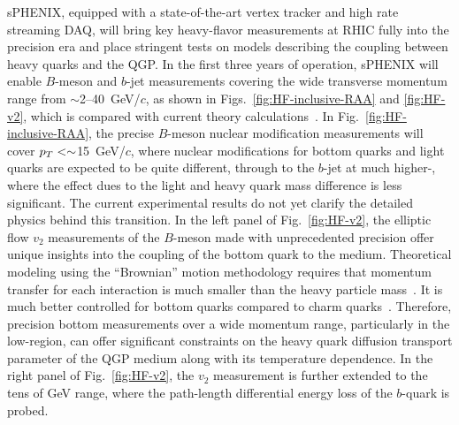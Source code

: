 sPHENIX, equipped with a state-of-the-art vertex tracker and high rate
streaming DAQ, will bring key heavy-flavor measurements at RHIC fully
into the precision era and place stringent tests on models describing
the coupling between heavy quarks and the QGP. In the first three
years of operation, sPHENIX will enable $B$-meson and $b$-jet
measurements covering the wide transverse momentum range from
$\sim$2--40~GeV/$c$, as shown in Figs.~\ref{fig:HF-inclusive-RAA} and
\ref{fig:HF-v2}, which is compared with current theory
calculations~\cite{Duke,TAMU,PHSD,CUJET,Huang:2013vaa,Ke:2020nsm}.  In
Fig.~\ref{fig:HF-inclusive-RAA}, the precise $B$-meson nuclear
modification measurements will cover $\mbox{${p_T}$} <\sim$15~GeV/$c$, where
nuclear modifications for bottom quarks and light quarks are expected
to be quite different, through to the $b$-jet at much higher-\pT,
where the effect dues to the light and heavy quark mass difference is
less significant.  The current experimental results do not yet clarify
the detailed physics behind this transition.  In the left panel of
Fig.~\ref{fig:HF-v2}, the elliptic flow $v_2$ measurements of the
$B$-meson made with unprecedented precision offer unique insights into
the coupling of the bottom quark to the medium.  Theoretical modeling
using the ``Brownian'' motion methodology requires that momentum
transfer for each interaction is much smaller than the heavy particle
mass~\cite{Moore:2004tg}. It is much better controlled for bottom
quarks compared to charm quarks~\cite{Das:2013kea}. Therefore,
precision bottom measurements over a wide momentum range, particularly
in the low-\pT region, can offer significant constraints on the heavy
quark diffusion transport parameter of the QGP medium along with its
temperature dependence. In the right panel of Fig.~\ref{fig:HF-v2},
the $v_2$ measurement is further extended to the tens of GeV range,
where the path-length differential energy loss of the $b$-quark is
probed.


